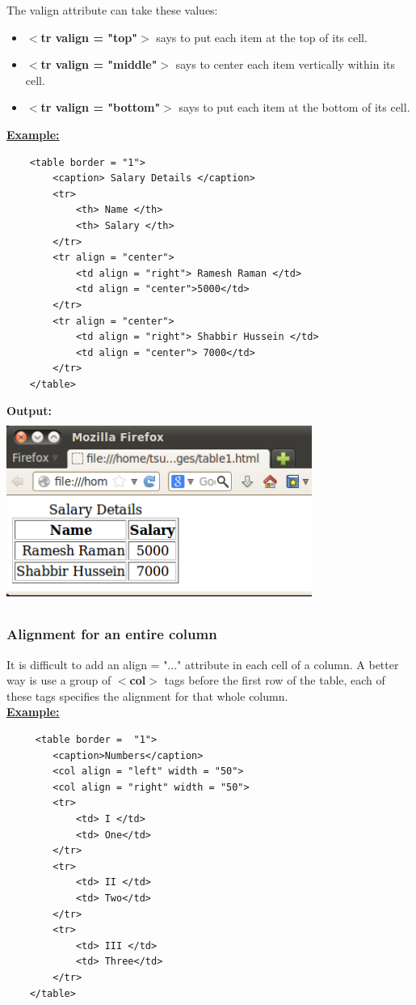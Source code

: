 \documentclass[11pt,a4paper]{article}
\begin{document}
The valign attribute can take these values:
\begin{itemize}
\item \textbf{$<$tr valign = "top"$>$} says to put each item at the top of its cell.
\item \textbf{$<$tr valign = "middle"$>$} says to center each item vertically within its cell.
\item \textbf{$<$tr valign = "bottom"$>$} says to put each item at the bottom of its cell.
\end{itemize}
\underline{\textbf{Example:}}\\
\begin{verbatim}
    <table border = "1">
        <caption> Salary Details </caption>
        <tr>
            <th> Name </th>
            <th> Salary </th>
        </tr>
        <tr align = "center">  
            <td align = "right"> Ramesh Raman </td>
            <td align = "center">5000</td>
        </tr>
        <tr align = "center">
            <td align = "right"> Shabbir Hussein </td>
            <td align = "center"> 7000</td>
        </tr>
    </table>
\end{verbatim}
\textbf{Output:}\\
\includegraphics[height = 60mm, width = 100mm]{Table3.png}
\subsubsection*{Alignment for an entire column}
It is difficult to add an align = "..." attribute in each cell of a column. A better way is use a group
of \textbf{$<$col$>$} tags before the first row of the table, each of these tags specifies the alignment for that whole column.\\

\underline{\textbf{Example:}}
\begin{verbatim}
     <table border =  "1">
        <caption>Numbers</caption>
        <col align = "left" width = "50">
        <col align = "right" width = "50">
        <tr>
            <td> I </td>
            <td> One</td> 
        </tr>
        <tr>
            <td> II </td>
            <td> Two</td> 
        </tr>
        <tr>
            <td> III </td>
            <td> Three</td> 
        </tr>
    </table>
\end{verbatim}
\end{document}
